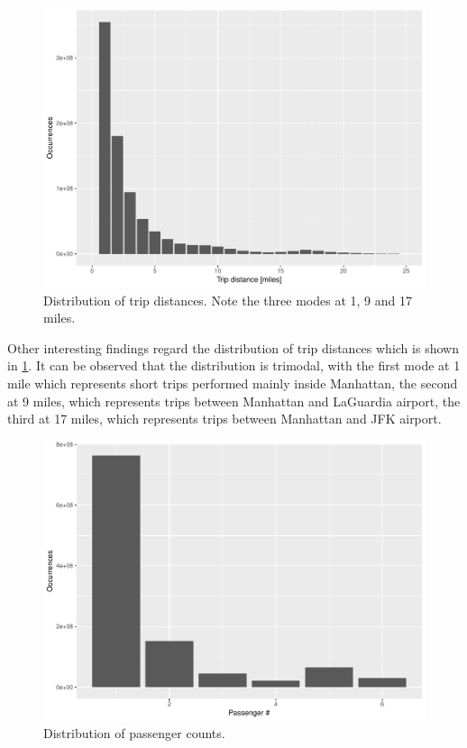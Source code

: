 \documentclass{acm_proc_article-sp-sigmod09}
\begin{document}
\begin{figure}
	\centering
	\includegraphics[width=1\columnwidth]{resources/base_plots/trip_distance_distr.pdf}
	\caption{Distribution of trip distances. Note the three modes at 1, 9 and 17 miles.}
	\label{fig:tripDistanceDistr}
\end{figure}

Other interesting findings regard the distribution of trip distances which is shown in \cref{fig:tripDistanceDistr}. It can be observed that the distribution is trimodal, with the first mode at 1 mile which represents short trips performed mainly inside Manhattan, the second at 9 miles, which represents trips between Manhattan and LaGuardia airport, the third at 17 miles, which represents trips between Manhattan and JFK airport.

\begin{figure}
	\centering
	\includegraphics[width=1\columnwidth]{resources/base_plots/passenger_count_dist.pdf}
	\caption{Distribution of passenger counts.}
	\label{fig:passengerCountDistr}
\end{figure}
\end{document}
